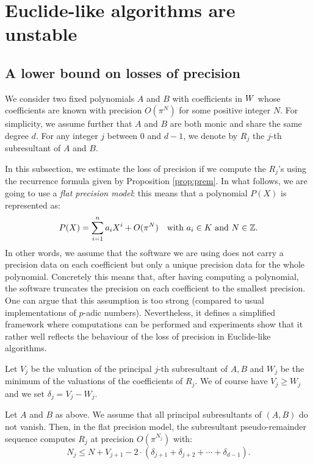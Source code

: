 \documentclass{article}
\begin{document}
\section{Euclide-like algorithms are unstable}
\label{sec:unstable}


\subsection{A lower bound on losses of precision}

We consider two fixed polynomials $A$ and $B$ with coefficients in $W$ 
whose coefficients are known with precision $O(\pi^N)$ for some positive
integer $N$. For simplicity, we assume further that $A$ and $B$ are both
monic and share the same degree $d$. 
For any integer $j$ between $0$ and $d-1$, we denote by $R_j$ the $j$-th 
subresultant of $A$ and $B$.

In this subsection, we estimate the loss of precision if we compute the 
$R_j$'s using the recurrence formula given by Proposition \ref{prop:prem}. 
In what follows, we are going to use a \emph{flat precision model}: this 
means that a polynomial $P(X)$ is represented as:
$$P(X) = \sum_{i=1}^n a_i X^i + O(\pi^N)
\quad \text{with } a_i \in K \text{ and } N \in \mathbb Z.$$
In other words, we assume that the software we are using does not
carry a precision data on each coefficient but only a unique precision
data for the whole polynomial. Concretely this means that, after having
computing a polynomial, the software truncates the precision on each
coefficient to the smallest precision. 
One can argue that this assumption is too strong (compared to usual
implementations of $p$-adic numbers). Nevertheless, it defines a 
simplified framework where computations can be performed and experiments 
show that it rather well reflects the behaviour of the loss of precision 
in Euclide-like algorithms.

Let $V_j$ be the valuation of the principal $j$-th subresultant of $A,B$ 
and $W_j$ be the minimum of the valuations of the coefficients of $R_j$. 
We of course have $V_j \geq W_j$ and we set $\delta_j = V_j - W_j$.

\begin{prop}
\label{prop:precEuclide}
Let $A$ and $B$ as above. We assume that all principal subresultants of 
$(A,B)$ do not vanish. Then, in the flat precision model, the 
subresultant pseudo-remainder sequence computes $R_j$ at precision 
$O(\pi^{N_j})$ with:
$$N_j \leq N + V_{j+1} - 2 \cdot (\delta_{j+1} + \delta_{j+2} + \cdots
+ \delta_{d-1}).$$
\end{prop}
\end{document}

